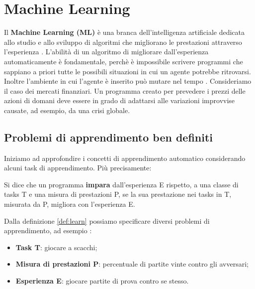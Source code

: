 \section{Machine Learning}
Il \textbf{Machine Learning (ML)} è una branca dell'intelligenza artificiale dedicata allo studio e allo sviluppo
di algoritmi che migliorano le prestazioni attraverso l'esperienza \cite{mlwiki}. L'abilità di un algoritmo di migliorare dall'esperienza
automaticamente è fondamentale, perchè è impossibile scrivere programmi  che sappiano a priori tutte le possibili situazioni in cui 
un agente potrebbe ritrovarsi. Inoltre l'ambiente in cui l'agente è inserito può mutare nel tempo \cite{aima}. Consideriamo il caso dei mercati finanziari.
Un programma creato per prevedere i prezzi delle azioni di domani deve essere in grado  di adattarsi alle variazioni improvvise causate, ad esempio,
da una crisi globale.
\subsection{Problemi di apprendimento ben definiti}
Iniziamo ad approfondire i concetti di apprendimento automatico considerando alcuni task di apprendimento. Più precisamente:
\begin{defn}\label{def:learn}
  Si dice che un programma \textbf{impara} dall'esperienza E rispetto, a una classe di tasks T e una misura di prestazioni P,
  se la sua prestazione nei tasks in T, misurata da P, migliora con l'esperienza E.
\end{defn}
Dalla definizione \ref{def:learn} possiamo specificare diversi problemi di apprendimento, ad esempio \cite{Mitchell97}:
\begin{itemize}
  \item \textbf{Task T}: giocare a scacchi;
  \item \textbf{Misura di prestazioni P}: percentuale di partite vinte contro gli avversari;
  \item \textbf{Esperienza E}: giocare partite di prova contro se stesso.
\end{itemize}



